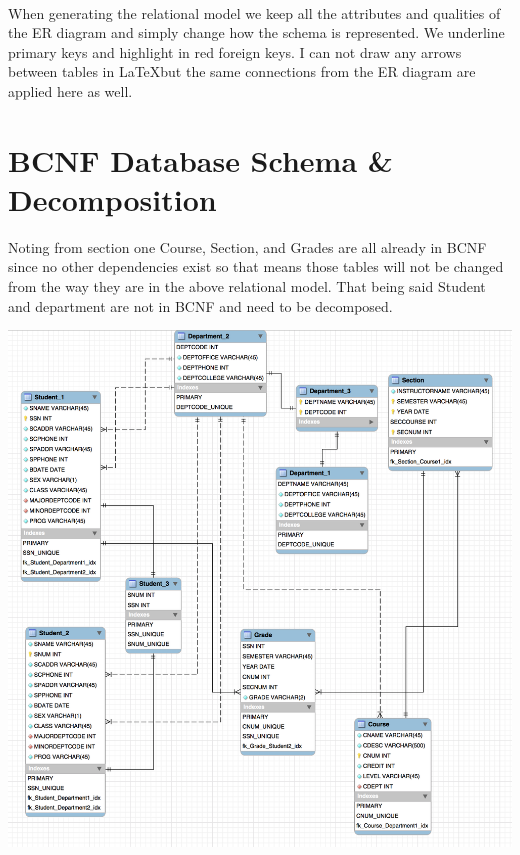 \documentclass[12pt]{article}
\begin{document}
			\paragraph{}
				When generating the relational model we keep all the attributes and qualities of the ER diagram and simply change how the schema is represented. We underline primary keys and highlight in red foreign keys. I can not draw any arrows between tables in \LaTeX but the same connections from the ER diagram are applied here as well.

	\section{BCNF Database Schema \& Decomposition}
		Noting from section one Course, Section, and Grades are all already in BCNF since no other dependencies exist so that means those tables will not be changed from the way they are in the above relational model. That being said Student and department are not in BCNF and need to be decomposed.

		\begin{center}
			\includegraphics[scale=0.3]{bcnf.PNG}\\
		\end{center}
\end{document}
